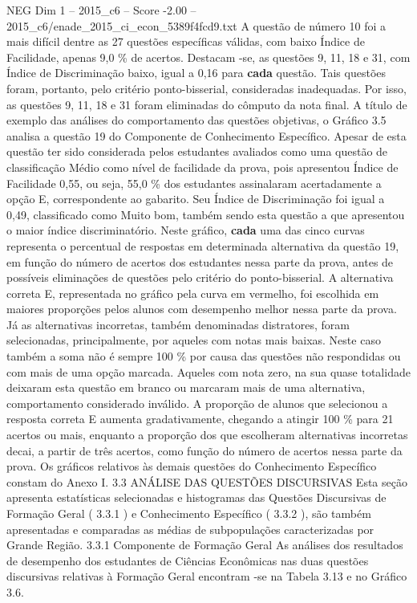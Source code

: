 \begin{textsample}{NEG Dim 1 – 2015\_c6 – Score -2.00 – 2015\_c6/enade\_2015\_ci\_econ\_5389f4fcd9.txt}
A questão de número 10 foi a mais difícil dentre as 27 questões específicas válidas, com baixo Índice de Facilidade, apenas 9,0 \% de acertos.
Destacam -se, as questões 9, 11, 18 e 31, com Índice de Discriminação baixo, igual a 0,16 para \textbf{cada} questão.
Tais questões foram, portanto, pelo critério ponto-bisserial, consideradas inadequadas.
Por isso, as questões 9, 11, 18 e 31 foram eliminadas do cômputo da nota final.
A título de exemplo das análises do comportamento das questões objetivas, o Gráfico 3.5 analisa a questão 19 do Componente de Conhecimento Específico.
Apesar de esta questão ter sido considerada pelos estudantes avaliados como uma questão de classificação Médio como nível de facilidade da prova, pois apresentou Índice de Facilidade 0,55, ou seja, 55,0 \% dos estudantes assinalaram acertadamente a opção E, correspondente ao gabarito.
Seu Índice de Discriminação foi igual a 0,49, classificado como Muito bom, também sendo esta questão a que apresentou o maior índice discriminatório.
Neste gráfico, \textbf{cada} uma das cinco curvas representa o percentual de respostas em determinada alternativa da questão 19, em função do número de acertos dos estudantes nessa parte da prova, antes de possíveis eliminações de questões pelo critério do ponto-bisserial.
A alternativa correta E, representada no gráfico pela curva em vermelho, foi escolhida em maiores proporções pelos alunos com desempenho melhor nessa parte da prova.
Já as alternativas incorretas, também denominadas distratores, foram selecionadas, principalmente, por aqueles com notas mais baixas.
Neste caso também a soma não é sempre 100 \% por causa das questões não respondidas ou com mais de uma opção marcada.
Aqueles com nota zero, na sua quase totalidade deixaram esta questão em branco ou marcaram mais de uma alternativa, comportamento considerado inválido.
A proporção de alunos que selecionou a resposta correta E aumenta gradativamente, chegando a atingir 100 \% para 21 acertos ou mais, enquanto a proporção dos que escolheram alternativas incorretas decai, a partir de três acertos, como função do número de acertos nessa parte da prova.
Os gráficos relativos às demais questões do Conhecimento Específico constam do Anexo I. 3.3 ANÁLISE DAS QUESTÕES DISCURSIVAS Esta seção apresenta estatísticas selecionadas e histogramas das Questões Discursivas de Formação Geral ( 3.3.1 ) e Conhecimento Específico ( 3.3.2 ), são também apresentadas e comparadas as médias de subpopulações caracterizadas por Grande Região. 3.3.1 Componente de Formação Geral As análises dos resultados de desempenho dos estudantes de Ciências Econômicas nas duas questões discursivas relativas à Formação Geral encontram -se na Tabela 3.13 e no Gráfico 3.6.

\end{textsample}
